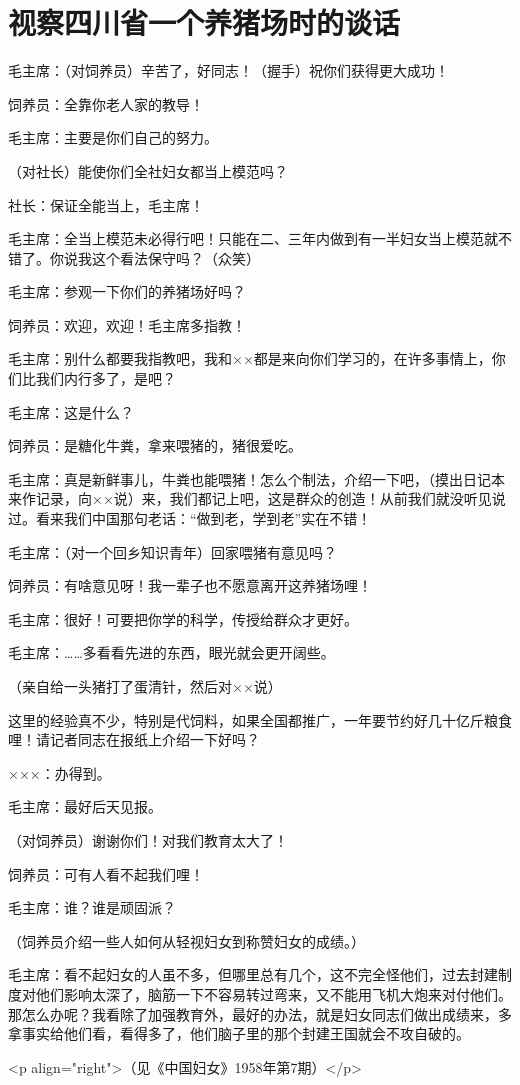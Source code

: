 \section[视察四川省一个养猪场时的谈话（一九五八年三月）]{视察四川省一个养猪场时的谈话}


毛主席：（对饲养员）辛苦了，好同志！（握手）祝你们获得更大成功！

饲养员：全靠你老人家的教导！

毛主席：主要是你们自己的努力。

（对社长）能使你们全社妇女都当上模范吗？

社长：保证全能当上，毛主席！

毛主席：全当上模范未必得行吧！只能在二、三年内做到有一半妇女当上模范就不错了。你说我这个看法保守吗？（众笑）

毛主席：参观一下你们的养猪场好吗？

饲养员：欢迎，欢迎！毛主席多指教！

毛主席：别什么都要我指教吧，我和××都是来向你们学习的，在许多事情上，你们比我们内行多了，是吧？

毛主席：这是什么？

饲养员：是糖化牛粪，拿来喂猪的，猪很爱吃。

毛主席：真是新鲜事儿，牛粪也能喂猪！怎么个制法，介绍一下吧，（摸出日记本来作记录，向××说）来，我们都记上吧，这是群众的创造！从前我们就没听见说过。看来我们中国那句老话：“做到老，学到老”实在不错！

毛主席：（对一个回乡知识青年）回家喂猪有意见吗？

饲养员：有啥意见呀！我一辈子也不愿意离开这养猪场哩！

毛主席：很好！可要把你学的科学，传授给群众才更好。

毛主席：……多看看先进的东西，眼光就会更开阔些。

（亲自给一头猪打了蛋清针，然后对××说）

这里的经验真不少，特别是代饲料，如果全国都推广，一年要节约好几十亿斤粮食哩！请记者同志在报纸上介绍一下好吗？

×××：办得到。

毛主席：最好后天见报。

（对饲养员）谢谢你们！对我们教育太大了！

饲养员：可有人看不起我们哩！

毛主席：谁？谁是顽固派？

（饲养员介绍一些人如何从轻视妇女到称赞妇女的成绩。）

毛主席：看不起妇女的人虽不多，但哪里总有几个，这不完全怪他们，过去封建制度对他们影响太深了，脑筋一下不容易转过弯来，又不能用飞机大炮来对付他们。那怎么办呢？我看除了加强教育外，最好的办法，就是妇女同志们做出成绩来，多拿事实给他们看，看得多了，他们脑子里的那个封建王国就会不攻自破的。

<p align="right">（见《中国妇女》1958年第7期）</p>


